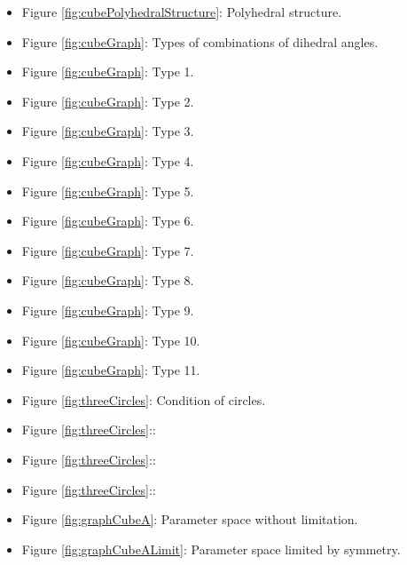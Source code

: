 \documentclass[suppldata, dvipdfmx]{interact}
\theoremstyle{plain}%
\theoremstyle{definition}
\theoremstyle{remark}
\theoremstyle{problemstyle}
\begin{document}
\begin{itemize}
\item Figure \ref{fig:cubePolyhedralStructure}: Polyhedral structure.
\item Figure \ref{fig:cubeGraph}: Types of combinations of dihedral
      angles.
\item Figure \ref{fig:cubeGraph}: Type 1.
\item Figure \ref{fig:cubeGraph}: Type 2.
\item Figure \ref{fig:cubeGraph}: Type 3.
\item Figure \ref{fig:cubeGraph}: Type 4.
\item Figure \ref{fig:cubeGraph}: Type 5.
\item Figure \ref{fig:cubeGraph}: Type 6.
\item Figure \ref{fig:cubeGraph}: Type 7.
\item Figure \ref{fig:cubeGraph}: Type 8.
\item Figure \ref{fig:cubeGraph}: Type 9.
\item Figure \ref{fig:cubeGraph}: Type 10.
\item Figure \ref{fig:cubeGraph}: Type 11.



\item Figure \ref{fig:threeCircles}: Condition of circles.
\item Figure \ref{fig:threeCircles}::
\item Figure \ref{fig:threeCircles}::
\item Figure \ref{fig:threeCircles}::

\item Figure \ref{fig:graphCubeA}: Parameter space without limitation.
\item Figure \ref{fig:graphCubeALimit}: Parameter space limited by symmetry.


\end{itemize}
\end{document}
